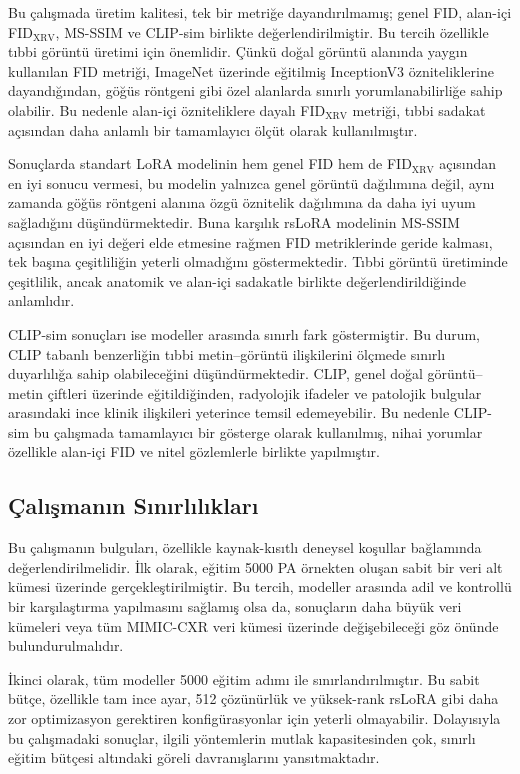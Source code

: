 \documentclass[11pt]{article}
\begin{document}
Bu çalışmada üretim kalitesi, tek bir metriğe dayandırılmamış; genel FID,
alan-içi FID$_{\text{XRV}}$, MS-SSIM ve CLIP-sim birlikte değerlendirilmiştir.
Bu tercih özellikle tıbbi görüntü üretimi için önemlidir. Çünkü doğal görüntü
alanında yaygın kullanılan FID metriği, ImageNet üzerinde eğitilmiş InceptionV3
özniteliklerine dayandığından, göğüs röntgeni gibi özel alanlarda sınırlı
yorumlanabilirliğe sahip olabilir. Bu nedenle alan-içi özniteliklere dayalı
FID$_{\text{XRV}}$ metriği, tıbbi sadakat açısından daha anlamlı bir tamamlayıcı
ölçüt olarak kullanılmıştır.

Sonuçlarda standart LoRA modelinin hem genel FID hem de FID$_{\text{XRV}}$
açısından en iyi sonucu vermesi, bu modelin yalnızca genel görüntü dağılımına
değil, aynı zamanda göğüs röntgeni alanına özgü öznitelik dağılımına da daha iyi
uyum sağladığını düşündürmektedir. Buna karşılık rsLoRA modelinin MS-SSIM
açısından en iyi değeri elde etmesine rağmen FID metriklerinde geride kalması,
tek başına çeşitliliğin yeterli olmadığını göstermektedir. Tıbbi görüntü
üretiminde çeşitlilik, ancak anatomik ve alan-içi sadakatle birlikte
değerlendirildiğinde anlamlıdır.

CLIP-sim sonuçları ise modeller arasında sınırlı fark göstermiştir. Bu durum,
CLIP tabanlı benzerliğin tıbbi metin--görüntü ilişkilerini ölçmede sınırlı
duyarlılığa sahip olabileceğini düşündürmektedir. CLIP, genel doğal
görüntü--metin çiftleri üzerinde eğitildiğinden, radyolojik ifadeler ve
patolojik bulgular arasındaki ince klinik ilişkileri yeterince temsil
edemeyebilir. Bu nedenle CLIP-sim bu çalışmada tamamlayıcı bir gösterge olarak
kullanılmış, nihai yorumlar özellikle alan-içi FID ve nitel gözlemlerle birlikte
yapılmıştır.

\subsection{Çalışmanın Sınırlılıkları}

Bu çalışmanın bulguları, özellikle kaynak-kısıtlı deneysel koşullar bağlamında
değerlendirilmelidir. İlk olarak, eğitim 5000 PA örnekten oluşan sabit bir veri
alt kümesi üzerinde gerçekleştirilmiştir. Bu tercih, modeller arasında adil ve
kontrollü bir karşılaştırma yapılmasını sağlamış olsa da, sonuçların daha büyük
veri kümeleri veya tüm MIMIC-CXR veri kümesi üzerinde değişebileceği göz önünde
bulundurulmalıdır.

İkinci olarak, tüm modeller 5000 eğitim adımı ile sınırlandırılmıştır. Bu
sabit bütçe, özellikle tam ince ayar, 512 çözünürlük ve yüksek-rank rsLoRA gibi
daha zor optimizasyon gerektiren konfigürasyonlar için yeterli olmayabilir.
Dolayısıyla bu çalışmadaki sonuçlar, ilgili yöntemlerin mutlak kapasitesinden
çok, sınırlı eğitim bütçesi altındaki göreli davranışlarını yansıtmaktadır.
\end{document}
